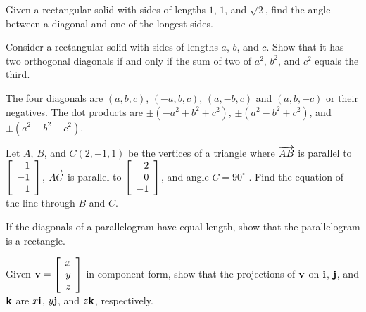 \begin{multicols}{2}
\begin{ex}
\begin{sol}
\begin{enumerate}[label={\alph*.}]
\end{enumerate}
\end{sol}
\end{ex}

\begin{ex}
Given a rectangular solid with sides of lengths $1$, $1$, and $\sqrt{2}$, find the angle between a diagonal and one of the longest sides.
\end{ex}

\begin{ex}
Consider a rectangular solid with sides of lengths $a$, $b$, and $c$. Show that it has two orthogonal diagonals if and only if the sum of two of $a^{2}$, $b^{2}$, and $c^{2}$ equals the third.

\begin{sol}
The four diagonals are $(a, b, c)$, $(-a, b, c)$, $(a, -b, c)$ and $(a, b, -c)$ or their negatives. The dot products are $\pm(-a^{2} + b^{2} + c^{2})$, $\pm(a^{2} - b^{2} + c^{2})$, and $\pm(a^{2} + b^{2} - c^{2})$.
\end{sol}
\end{ex}

\begin{ex}
Let $A$, $B$, and $C(2, -1, 1)$ be the vertices of a triangle where $\overrightarrow{AB}$ is parallel to $\left[
\begin{array}{r}
1\\
-1\\
1
\end{array}
\right]$, $\overrightarrow{AC}$ is parallel to $\left[
\begin{array}{r}
2\\
0\\
-1
\end{array}
\right]$, and angle $C = 90^\circ$ . Find the equation of the line through $B$ and $C$.
\end{ex}

\begin{ex}
If the diagonals of a parallelogram have equal length, show that the parallelogram is a rectangle.
\end{ex}

\begin{ex}
Given $\textbf{v} = \left[
\begin{array}{r}
x\\
y\\
z
\end{array}
\right]$
 in component form, show that the projections of $\textbf{v}$ on $\textbf{i}$, $\textbf{j}$, and $\textbf{k}$ are $x\textbf{i}$, $y\textbf{j}$, and $z\textbf{k}$, respectively.
\end{ex}


\end{multicols}
